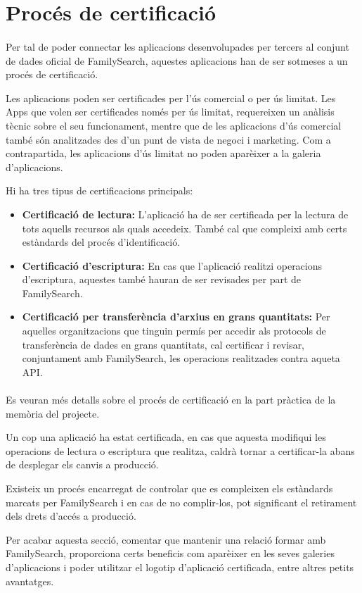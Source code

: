 \section{Procés de certificació}

    \paragraph{}
    Per tal de poder connectar les aplicacions desenvolupades per tercers al conjunt de dades oficial de FamilySearch, aquestes aplicacions han de ser sotmeses a un procés de certificació.

    Les aplicacions poden ser certificades per l'ús comercial o per ús limitat. Les Apps que volen ser certificades només per ús limitat, requereixen un anàlisis tècnic sobre el seu funcionament, mentre que de les aplicacions d'ús comercial també són analitzades des d'un punt de vista de negoci i marketing. Com a contrapartida, les aplicacions d'ús limitat no poden aparèixer a la galeria d'aplicacions.

    Hi ha tres tipus de certificacions principals:

    \begin{itemize}
        \item \textbf{Certificació de lectura:} L'aplicació ha de ser certificada per la lectura de tots aquells recursos als quals accedeix. També cal que compleixi amb certs estàndards del procés d'identificació.
        \item \textbf{Certificació d'escriptura:} En cas que l'aplicació realitzi operacions d'escriptura, aquestes també hauran de ser revisades per part de FamilySearch.
        \item \textbf{Certificació per transferència d'arxius en grans quantitats:} Per aquelles organitzacions que tinguin permís per accedir als protocols de transferència de dades en grans quantitats, cal certificar i revisar, conjuntament amb FamilySearch, les operacions realitzades contra aqueta API.
    \end{itemize}

    \paragraph{}
    Es veuran més detalls sobre el procés de certificació en la part pràctica de la memòria del projecte.

    Un cop una aplicació ha estat certificada, en cas que aquesta modifiqui les operacions de lectura o escriptura que realitza, caldrà tornar a certificar-la abans de desplegar els canvis a producció.

    Existeix un procés encarregat de controlar que es compleixen els estàndards marcats per FamilySearch i en cas de no complir-los, pot significant el retirament dels drets d'accés a producció.

    Per acabar aquesta secció, comentar que mantenir una relació formar amb FamilySearch, proporciona certs beneficis com aparèixer en les seves galeries d'aplicacions i poder utilitzar el logotip d'aplicació certificada, entre altres petits avantatges.

